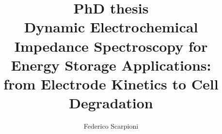 \title{PhD thesis \\ 
Dynamic Electrochemical Impedance Spectroscopy for Energy Storage Applications: \\ from Electrode Kinetics to Cell Degradation}
\author{Federico Scarpioni}